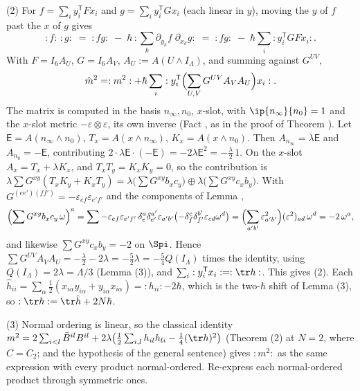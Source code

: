 (2) For $f = \sum_{i}y_{i}^{\mathsf T}Fx_{i}$ and $g = \sum_{i}y_{i}^{\mathsf T}Gx_{i}$ (each linear in $y$), moving the $y$ of $f$ past the $x$ of $g$ gives
\[
:f:\,:g: \;=\; :fg: \;-\; \hbar\,:\sum_{k}\partial_{y_{k}}f\;\partial_{x_{k}}g: \;=\; :fg: \;-\; \hbar\sum_{i}:y_{i}^{\mathsf T}GFx_{i}: .
\]
With $F = I_{6} A_{U}$, $G = I_{6} A_{V}$, $A_{U} := A(U\wedge I_{\Lambda})$, and summing against $G^{UV}$,
\[
\hat{m}^{2} = :m^{2}: + \hbar\sum_{i}:y_{i}^{\mathsf T}\Bigl(\sum_{U,V}G^{UV}A_{V}A_{U}\Bigr)x_{i}: .
\]
The matrix is computed in the basis $n_{\infty}, n_{0}$, $x$-slot, with $\ip{n_{\infty}}{n_{0}} = 1$ and the $x$-slot metric $-\varepsilon\otimes\varepsilon$, its own inverse (Fact , as in the proof of Theorem ). Let $\mathsf{E} = A(n_{\infty}\wedge n_{0})$, $T_{x} = A(x\wedge n_{\infty})$, $K_{x} = A(x\wedge n_{0})$. Then $A_{n_{\infty}} = \lambda\mathsf{E}$ and $A_{n_{0}} = -\mathsf{E}$, contributing $2\cdot\lambda\mathsf{E}\cdot(-\mathsf{E}) = -2\lambda\mathsf{E}^{2} = -\tfrac{\lambda}{2}\,1$. On the $x$-slot $A_{x} = T_{x} + \lambda K_{x}$, and $T_{x}T_{y} = K_{x}K_{y} = 0$, so the contribution is $\lambda\sum G^{xy}(T_{x}K_{y} + K_{x}T_{y}) = \lambda\bigl(\sum G^{xy}b_{x}c_{y}\bigr)\oplus\lambda\bigl(\sum G^{xy}c_{x}b_{y}\bigr)$. With $G^{(ee')(ff')} = -\varepsilon_{ef}\varepsilon_{e'f'}$ and the components of Lemma ,
\[
\Bigl(\sum G^{xy}b_{x}c_{y}\,\omega\Bigr)^{a} = \sum -\varepsilon_{ef}\varepsilon_{e'f'}\,\delta^{a}_{e}\delta^{a'}_{e'}\varepsilon_{a'b'}\bigl(-\delta^{c}_{f}\delta^{b'}_{f'}\varepsilon_{cd}\omega^{d}\bigr) = \Bigl(\sum_{a'b'}\varepsilon_{a'b'}^{2}\Bigr)(\varepsilon^{2})_{ad}\,\omega^{d} = -2\,\omega^{a},
\]
and likewise $\sum G^{xy}c_{x}b_{y} = -2$ on $\Spi$. Hence $\sum G^{UV}A_{V}A_{U} = -\tfrac{\lambda}{2} - 2\lambda = -\tfrac52\lambda = -\tfrac54Q(I_{\Lambda})$ times the identity, using $Q(I_{\Lambda}) = 2\lambda = \Lambda/3$ (Lemma (3)), and $\sum_{i}:y_{i}^{\mathsf T}x_{i}: = :\tr h:$. This gives (2). Each $\hat{h}_{ii} = \sum_{\alpha}\tfrac12(x_{i\alpha}y_{i\alpha} + y_{i\alpha}x_{i\alpha}) = :h_{ii}: - 2\hbar$, which is the two-$\hbar$ shift of Lemma (3), so $:\tr h: = \tr\hat{h} + 2N\hbar$.

(3) Normal ordering is linear, so the classical identity $m^{2} = 2\sum_{i<l}\bar{B}^{il}B^{il} + 2\lambda\bigl(\tfrac12\sum_{i,l}h_{il}h_{li} - \tfrac14(\tr h)^{2}\bigr)$ (Theorem (2) at $N = 2$, where $C = C_{2}$; and the hypothesis of the general sentence) gives $:m^{2}:$ as the same expression with every product normal-ordered. Re-express each normal-ordered product through symmetric ones.

